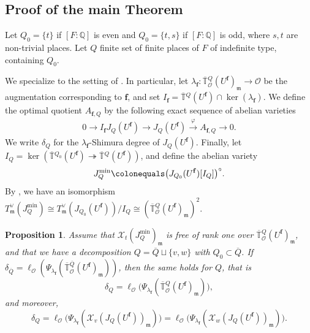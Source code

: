 \documentclass[a4paper, notitlepage, 10pt]{amsart}
\theoremstyle{plain} %
\newtheorem{proposition}[theorem]{Proposition}
\theoremstyle{definition} %
\theoremstyle{remark} %
\numberwithin{equation}{section}
\newcommand{\bbQ}{\mathbb Q}
\newcommand{\bbT}{\mathbb T}
\begin{document}
\subsection{Proof of the main Theorem}\label{proofofmaintheorem}
Let $Q_0=\{t\}$ if $[F:\bbQ]$ is even and $Q_0=\{t,s\}$ if $[F:\bbQ]$ is odd, where $s,t$ are non-trivial places. Let $Q$ finite set of finite places of $F$ of indefinite type, containing $Q_0$.

We specialize to the setting of . In particular, let $\lambda_{\mathbf{f}}\colon \overline{\bbT}{}^Q_{\mathcal{O}}(U^{\mathbf{f}})_{\mathfrak{m}}\to \mathcal{O}$ be the augmentation corresponding to $\mathbf{f}$, and set $I_{\mathbf{f}}=\overline{\bbT}{}^Q(U^{\mathbf{f}})\cap \ker(\lambda_{\mathbf{f}})$. We define the optimal quotient $A_{\mathbf{f},Q}$ by the following exact sequence of abelian varieties
    \begin{align*}
        0 \rightarrow I_{\mathbf{f}} J_Q(U^{\mathbf{f}})\rightarrow J_Q(U^{\mathbf{f}}) \xrightarrow{\varphi} A_{\mathbf{f},Q} \rightarrow 0.
\end{align*}
 We write $\delta_Q$ for the $\lambda_{\mathbf{f}}$-Shimura degree of $J_Q(U^{\mathbf{f}})$.
Finally, let  $I_Q=\ker(\overline{\bbT}{}^{Q_0}(U^{\mathbf{f}})\twoheadrightarrow \overline{\bbT}{}^{Q}(U^{\mathbf{f}}))$, and define the abelian variety
    \begin{align*}
         J^{\min}_{Q}\colonequals \big(J_{Q_0}(U^{\mathbf{f}})[I_{Q}]\big)^\circ.
    \end{align*}
 By \cite[Corollary 2.5]{Em03}, we have an isomorphism $T^\vee_{\mathfrak{m}}(J^{\min}_{Q})\cong T^\vee_{\mathfrak{m}}(J_{Q_0}(U^{\mathbf{f}}))/I_{Q}\cong (\overline{\bbT}{}^{Q}_{\mathcal{O}}(U^{\mathbf{f}})_{\mathfrak{m}})^2.$
\begin{proposition}\label{preliminaryfinalresult} Assume that $\mathcal{X}_t(J^{\min}_Q)_{\mathfrak{m}}$ is free of rank one over $\overline{\bbT}{}^{Q}_{\mathcal{O}}(U^{\mathbf{f}})_{\mathfrak{m}}$, and that we have a decomposition $Q=\overline{Q}\sqcup \{v,w\}$ with $Q_0\subset \overline{Q}$. If  $\delta_{\overline{Q}}=\ell_{\mathcal{O}}(\Psi_{\lambda_{\mathbf{f}}}(\overline{\bbT}{}^{\overline{Q}}_{\mathcal{O}}(U^{\mathbf{f}})_{\mathfrak{m}}))$, then the same holds for $Q$, that is
    $$ \delta_{Q}= \ell_{\mathcal{O}}\big(\Psi_{\lambda_{\mathbf{f}}}(\overline{\bbT}{}^{Q}_{\mathcal{O}}(U^{\mathbf{f}})_{\mathfrak{m}})\big),$$
and moreover, $$\delta_Q= \ell_{\mathcal{O}}\big(\Psi_{\lambda_{\mathbf{f}}}(\mathcal{X}_{v}(J_{Q}(U^{\mathbf{f}}))_{\mathfrak{m}})\big)=\ell_{\mathcal{O}}\big(\Psi_{\lambda_{\mathbf{f}}}(\mathcal{X}_{w}(J_{Q}(U^{\mathbf{f}}))_{\mathfrak{m}})\big).$$
\end{proposition}
\end{document}
